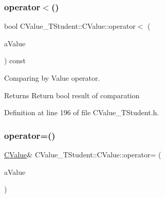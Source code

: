 \mbox{\label{class_c_value___t_student_1_1_c_value_a616db0b5d1db68fef3d0cdfb382e37c4}} 
\subsubsection{\texorpdfstring{operator$<$()}{operator<()}}
{\footnotesize\ttfamily bool C\+Value\+\_\+\+T\+Student\+::\+C\+Value\+::operator$<$ (\begin{DoxyParamCaption}\item[{const \hyperlink{class_c_value___t_student_1_1_c_value}{C\+Value} \&}]{a\+Value }\end{DoxyParamCaption}) const\hspace{0.3cm}{\ttfamily [inline]}}



Comparing by Value operator. 

\begin{DoxyReturn}{Returns}
Return {\ttfamily bool} result of comparation 
\end{DoxyReturn}


Definition at line 196 of file C\+Value\+\_\+\+T\+Student.\+h.

\mbox{\label{class_c_value___t_student_1_1_c_value_a837c1a449684ebdb0235449f214deb9d}} 
\subsubsection{\texorpdfstring{operator=()}{operator=()}}
{\footnotesize\ttfamily \hyperlink{class_c_value___t_student_1_1_c_value}{C\+Value}\& C\+Value\+\_\+\+T\+Student\+::\+C\+Value\+::operator= (\begin{DoxyParamCaption}\item[{const \hyperlink{class_c_value___t_student_1_1_c_value}{C\+Value} \&}]{a\+Value }\end{DoxyParamCaption})\hspace{0.3cm}{\ttfamily [inline]}}



